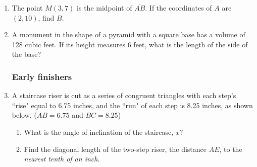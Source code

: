 \documentclass[12pt, twoside]{article}
\begin{document}
\begin{enumerate}
  \item The point $M(3,7)$ is the midpoint of $\overline{AB}$. If the coordinates of $A$ are $(2,10)$, find $B$. \vspace{2.5cm}

  \item A monument in the shape of a pyramid with a square base has a volume of 128 cubic feet. If its height measures 6 feet, what is the length of the side of the base? \vspace{3.5cm}

\newpage
\subsubsection*{Early finishers}

  \item A staircase riser is cut as a series of congruent triangles with each step's ``rise" equal to 6.75 inches, and the ``run" of each step is 8.25 inches, as shown below. ($AB=6.75$ and $BC=8.25$)
  \begin{enumerate}
    \item What is the angle of inclination of the staircase, $x$?\\[0.5cm] 
      \item Find the diagonal length of the two-step riser, the distance $AE$, to the \emph{nearest tenth of an inch}.
    \end{enumerate} \vspace{2.5cm}


\end{enumerate}
\end{document}
